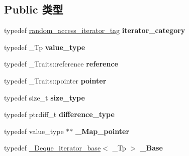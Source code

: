 \subsection*{Public 类型}
\begin{DoxyCompactItemize}
\item 
\mbox{\label{struct___deque__iterator_a80dc0842c2ef5fc143a61feb33c73346}} 
typedef \hyperlink{structrandom__access__iterator__tag}{random\+\_\+access\+\_\+iterator\+\_\+tag} {\bfseries iterator\+\_\+category}
\item 
\mbox{\label{struct___deque__iterator_a8b2df6da73cf5ba31ef4d728f3e100df}} 
typedef \+\_\+\+Tp {\bfseries value\+\_\+type}
\item 
\mbox{\label{struct___deque__iterator_a473fb39a874e2ddca1a65e8da7f92cdb}} 
typedef \+\_\+\+Traits\+::reference {\bfseries reference}
\item 
\mbox{\label{struct___deque__iterator_a7b67bcd1c5259faabc5bce3d96096359}} 
typedef \+\_\+\+Traits\+::pointer {\bfseries pointer}
\item 
\mbox{\label{struct___deque__iterator_a542ebdc40890e48c4aaa321e93ff587f}} 
typedef size\+\_\+t {\bfseries size\+\_\+type}
\item 
\mbox{\label{struct___deque__iterator_ad9d05a1d17eaeb0a4eaf021eae2bd8c6}} 
typedef ptrdiff\+\_\+t {\bfseries difference\+\_\+type}
\item 
\mbox{\label{struct___deque__iterator_aecfbf4e21317d795a281eda914aa72ab}} 
typedef value\+\_\+type $\ast$$\ast$ {\bfseries \+\_\+\+Map\+\_\+pointer}
\item 
\mbox{\label{struct___deque__iterator_a86c12345fa93cbe55ea654abe1ba4c21}} 
typedef \hyperlink{struct___deque__iterator__base}{\+\_\+\+Deque\+\_\+iterator\+\_\+base}$<$ \+\_\+\+Tp $>$ {\bfseries \+\_\+\+Base}
\item 
\mbox{\label{struct___deque__iterator_abd85c917b3fb81067e3634aa70be9df3}} 
$$
\end{DoxyCompactItemize}

